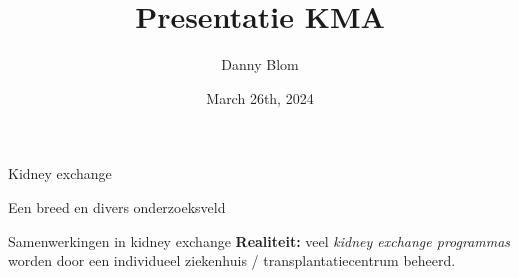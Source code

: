 \documentclass{beamer}
\title{Presentatie KMA}
\date[26-03-2024]{March 26th, 2024}
\author[Danny Blom]{Danny Blom}
\begin{document}
              
\begin{frame}
    \maketitle 
\end{frame}

\begin{frame}{Kidney exchange}
    
    \vskip6cm%
\end{frame}

\begin{frame}{Een breed en divers onderzoeksveld}
    
\end{frame}

\begin{frame}{Samenwerkingen in kidney exchange}
\vspace{-3cm}%
\textbf{Realiteit:} veel \emph{kidney exchange programmas} worden door een individueel ziekenhuis / transplantatiecentrum beheerd.
\vskip5pt%


{

    \vskip10pt%
    
}

\end{frame}
\end{document}
